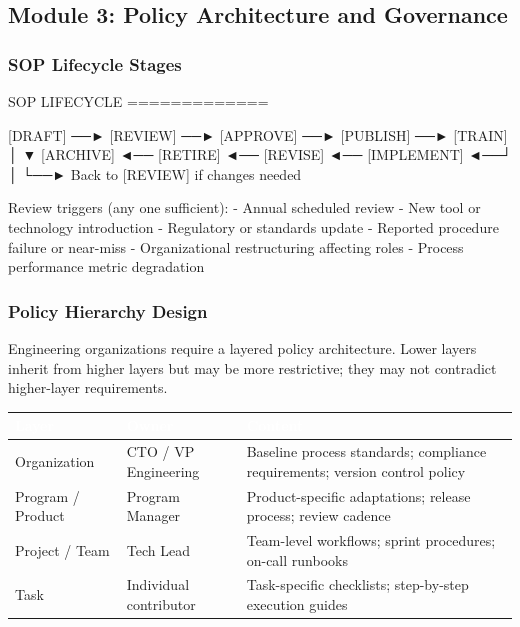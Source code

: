 \documentclass[11pt,letterpaper]{article}
\newcommand{\tableheader}[1]{\textbf{\sffamily\textcolor{white}{#1}}}
\begin{document}
\subsection{Module 3: Policy Architecture and Governance}

\subsubsection{SOP Lifecycle Stages}

\begin{asciibox}
  SOP LIFECYCLE
  =============

  [DRAFT] ──► [REVIEW] ──► [APPROVE] ──► [PUBLISH] ──► [TRAIN]
                                                            │
                                                            ▼
  [ARCHIVE] ◄── [RETIRE] ◄── [REVISE] ◄── [IMPLEMENT] ◄──┘
                                │
                                └──► Back to [REVIEW] if changes needed

  Review triggers (any one sufficient):
  - Annual scheduled review
  - New tool or technology introduction
  - Regulatory or standards update
  - Reported procedure failure or near-miss
  - Organizational restructuring affecting roles
  - Process performance metric degradation
\end{asciibox}

\subsubsection{Policy Hierarchy Design}

Engineering organizations require a layered policy architecture. Lower layers inherit from higher layers but may be more restrictive; they may not contradict higher-layer requirements.

\begin{center}
\begin{tabularx}{\textwidth}{L{3cm}L{3cm}X}
\toprule
{}
\tableheader{Layer} & \tableheader{Owner} & \tableheader{Content} \\
\midrule
Organization & CTO / VP Engineering & Baseline process standards; compliance requirements; version control policy \\
Program / Product & Program Manager & Product-specific adaptations; release process; review cadence \\
Project / Team & Tech Lead & Team-level workflows; sprint procedures; on-call runbooks \\
Task & Individual contributor & Task-specific checklists; step-by-step execution guides \\
\bottomrule
\end{tabularx}
\end{center}
\end{document}

